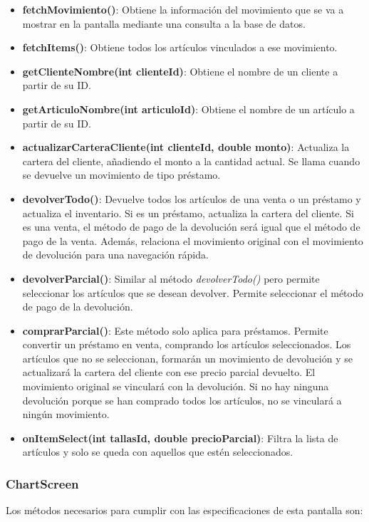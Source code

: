 \begin{itemize}
	\item \textbf{fetchMovimiento()}: Obtiene la información del movimiento que se va a mostrar en la pantalla mediante una consulta a la base de datos. 
	\item \textbf{fetchItems()}: Obtiene todos los artículos vinculados a ese movimiento. 
	\item \textbf{getClienteNombre(int clienteId)}: Obtiene el nombre de un cliente a partir de su ID. 
	\item \textbf{getArticuloNombre(int articuloId)}: Obtiene el nombre de un artículo a partir de su ID. 
	\item \textbf{actualizarCarteraCliente(int clienteId, double monto)}: Actualiza la cartera del cliente, añadiendo el monto a la cantidad actual. Se llama cuando se devuelve un movimiento de tipo préstamo.  
	\item \textbf{devolverTodo()}: Devuelve todos los artículos de una venta o un préstamo y actualiza el inventario. Si es un préstamo, actualiza la cartera del cliente. Si es una venta, el método de pago de la devolución será igual que el método de pago de la venta. Además, relaciona el movimiento original con el movimiento de devolución para una navegación rápida. 
	\item \textbf{devolverParcial()}: Similar al método \textit{devolverTodo()} pero permite seleccionar los artículos que se desean devolver. Permite seleccionar el método de pago de la devolución. 
	\item \textbf{comprarParcial()}: Este método solo aplica para préstamos. Permite convertir un préstamo en venta, comprando los artículos seleccionados. Los artículos que no se seleccionan, formarán un movimiento de devolución y se actualizará la cartera del cliente con ese precio parcial devuelto. El movimiento original se vinculará con la devolución. Si no hay ninguna devolución porque se han comprado todos los artículos, no se vinculará a ningún movimiento. 
	\item \textbf{onItemSelect(int tallasId, double precioParcial)}: Filtra la lista de artículos y solo se queda con aquellos que estén seleccionados. 
\end{itemize}

\subsubsection{ChartScreen}

Los métodos necesarios para cumplir con las especificaciones de esta pantalla son:

